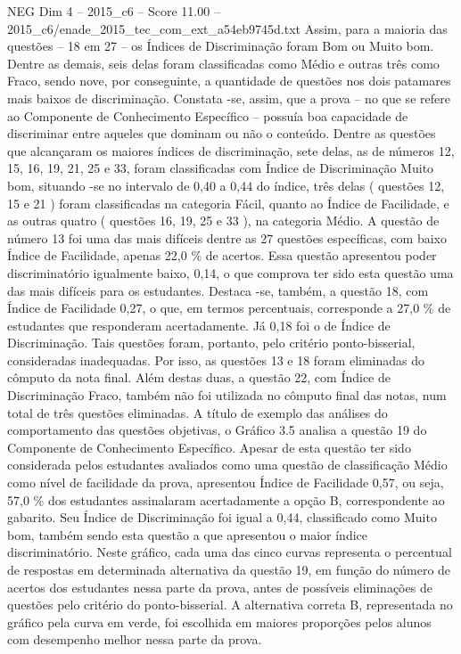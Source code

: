 \begin{textsample}{NEG Dim 4 – 2015\_c6 – Score 11.00 – 2015\_c6/enade\_2015\_tec\_com\_ext\_a54eb9745d.txt}
Assim, para a maioria das questões – 18 em 27 – os Índices de Discriminação foram Bom ou Muito bom.
Dentre as demais, seis delas foram classificadas como Médio e outras três como Fraco, sendo nove, por conseguinte, a quantidade de questões nos dois patamares mais baixos de discriminação.
Constata -se, assim, que a prova – no que se refere ao Componente de Conhecimento Específico – possuía boa capacidade de discriminar entre aqueles que dominam ou não o conteúdo.
Dentre as questões que alcançaram os maiores índices de discriminação, sete delas, as de números 12, 15, 16, 19, 21, 25 e 33, foram classificadas com Índice de Discriminação Muito bom, situando -se no intervalo de 0,40 a 0,44 do índice, três delas ( questões 12, 15 e 21 ) foram classificadas na categoria Fácil, quanto ao Índice de Facilidade, e as outras quatro ( questões 16, 19, 25 e 33 ), na categoria Médio.
A questão de número 13 foi uma das mais difíceis dentre as 27 questões específicas, com baixo Índice de Facilidade, apenas 22,0 \% de acertos.
Essa questão apresentou poder discriminatório igualmente baixo, 0,14, o que comprova ter sido esta questão uma das mais difíceis para os estudantes.
Destaca -se, também, a questão 18, com Índice de Facilidade 0,27, o que, em termos percentuais, corresponde a 27,0 \% de estudantes que responderam acertadamente.
Já 0,18 foi o de Índice de Discriminação.
Tais questões foram, portanto, pelo critério ponto-bisserial, consideradas inadequadas.
Por isso, as questões 13 e 18 foram eliminadas do cômputo da nota final.
Além destas duas, a questão 22, com Índice de Discriminação Fraco, também não foi utilizada no cômputo final das notas, num total de três questões eliminadas.
A título de exemplo das análises do comportamento das questões objetivas, o Gráfico 3.5 analisa a questão 19 do Componente de Conhecimento Específico.
Apesar de esta questão ter sido considerada pelos estudantes avaliados como uma questão de classificação Médio como nível de facilidade da prova, apresentou Índice de Facilidade 0,57, ou seja, 57,0 \% dos estudantes assinalaram acertadamente a opção B, correspondente ao gabarito.
Seu Índice de Discriminação foi igual a 0,44, classificado como Muito bom, também sendo esta questão a que apresentou o maior índice discriminatório.
Neste gráfico, cada uma das cinco curvas representa o percentual de respostas em determinada alternativa da questão 19, em função do número de acertos dos estudantes nessa parte da prova, antes de possíveis eliminações de questões pelo critério do ponto-bisserial.
A alternativa correta B, representada no gráfico pela curva em verde, foi escolhida em maiores proporções pelos alunos com desempenho melhor nessa parte da prova.

\end{textsample}
